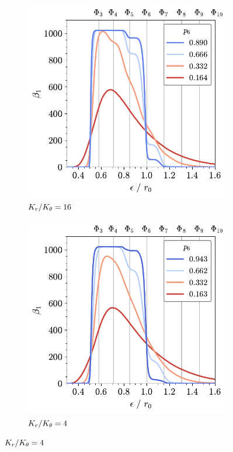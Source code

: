 \begin{figure}[tb]
	\centering
     
      \begin{subfigure}[b]{0.45\textwidth}
         \centering
         \includegraphics[width=\textwidth]{./figures/ph/bs_k16_beta1_cut.pdf}
         \caption{$K_r/K_\theta=16$}
         \label{fig:bsbettia}
     \end{subfigure}
     \hfill
     \begin{subfigure}[b]{0.45\textwidth}
         \centering
         \includegraphics[width=\textwidth]{./figures/ph/bs_k4_beta1_cut.pdf}
         \caption{$K_r/K_\theta=4$}
         \label{fig:bsbettib}
     \end{subfigure}


\end{figure}
